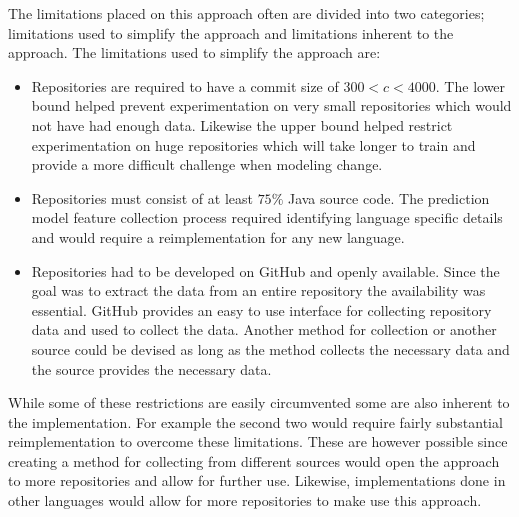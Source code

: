 The limitations placed on this approach often are divided into two categories; limitations used to simplify the approach and limitations inherent to the approach. The limitations used to simplify the approach are:
\begin{itemize}
\item Repositories are required to have a commit size of $300 < c < 4000$. The lower bound helped prevent experimentation on very small repositories which would not have had enough data. Likewise the upper bound helped restrict experimentation on huge repositories which will take longer to train and provide a more difficult challenge when modeling change.
\item Repositories must consist of at least $75\%$ Java source code. The prediction model feature collection process required identifying language specific details and would require a reimplementation for any new language.
\item Repositories had to be developed on GitHub and openly available. Since the goal was to extract the data from an entire repository the availability was essential. GitHub provides an easy to use interface for collecting repository data and used to collect the data. Another method for collection or another source could be devised as long as the method collects the necessary data and the source provides the necessary data.
\end{itemize}
While some of these restrictions are easily circumvented some are also inherent to the implementation. For example the second two would require fairly substantial reimplementation to overcome these limitations. These are however possible since creating a method for collecting from different sources would open the approach to more repositories and allow for further use. Likewise, implementations done in other languages would allow for more repositories to make use this approach.

